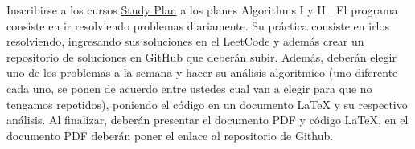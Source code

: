 Inscribirse a los cursos \href{https://leetcode.com/study-plan/}{Study Plan} a los planes Algorithms I y II . El programa consiste en ir resolviendo problemas diariamente. Su práctica consiste en irlos resolviendo, ingresando sus soluciones en el LeetCode y además crear un repositorio de soluciones en GitHub que deberán subir. Además, deberán elegir uno de los problemas a la semana y hacer su análisis algoritmico (uno diferente cada uno, se ponen de acuerdo entre ustedes cual van a elegir para que no tengamos repetidos), poniendo el código en un documento LaTeX y su respectivo análisis. Al finalizar, deberán presentar el documento PDF y código LaTeX, en el documento PDF deberán poner el enlace al repositorio de Github.






























